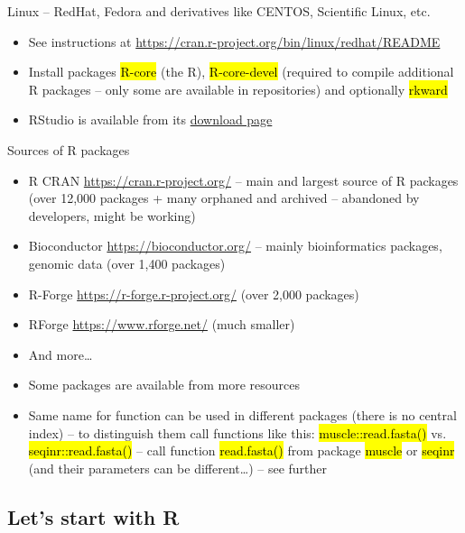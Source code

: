 \documentclass[compress, ucs, xelatex, 11pt, xcolor=svgnames,
  hyperref={
    bookmarks=true,
    unicode=true,
    colorlinks=true,
    pdftitle={Molecular data in R},
    plainpages=false,
    pdfauthor={Vojtech Zeisek},
    pdfsubject={Course about phylogeny and evolution in R},
    pdfcreator={XeLaTeX},
    pdfkeywords={R, evolution, phylogeny, molecular data},
    linkcolor=Tomato,
    anchorcolor=SaddleBrown,
    citecolor=Goldenrod,
    filecolor=DarkMagenta,
    menucolor=Sienna,
    urlcolor=DarkTurquoise,
    pdftex},
  url={hyphens, lowtilde} %
  ]{beamer}
\renewcommand{\texttt}[1]{\hl{\ttfamily #1}}
\begin{document}
\begin{frame}{Linux -- RedHat, Fedora and derivatives like CENTOS, Scientific Linux, etc.}
  \begin{itemize}
    \item See instructions at \url{https://cran.r-project.org/bin/linux/redhat/README}
    \item Install packages \texttt{R-core} (the R), \texttt{R-core-devel} (required to compile additional R packages -- only some are available in repositories) and optionally \texttt{rkward}
    \item RStudio is available from its \href{https://www.rstudio.com/products/rstudio/download/\#download}{download page}
  \end{itemize}
\end{frame}

\begin{frame}{Sources of R packages}
  \label{sources}
  \begin{itemize}
    \item R CRAN \url{https://cran.r-project.org/} -- main and largest source of R packages (over 12,000 packages + many orphaned and archived -- abandoned by developers, might be working)
    \item Bioconductor \url{https://bioconductor.org/} -- mainly bioinformatics packages, genomic data (over 1,400 packages)
    \item R-Forge \url{https://r-forge.r-project.org/} (over 2,000 packages)
    \item RForge \url{https://www.rforge.net/} (much smaller)
    \item And more\ldots
    \item Some packages are available from more resources
    \item Same name for function can be used in different packages (there is no central index) -- to distinguish them call functions like this: \texttt{muscle::read.fasta()} vs. \texttt{seqinr::read.fasta()} -- call function \texttt{read.fasta()} from package \texttt{muscle} \alert{or} \texttt{seqinr} (and their parameters can be different\ldots) -- see further
  \end{itemize}
\end{frame}

\subsection{Let's start with R}
\end{document}
